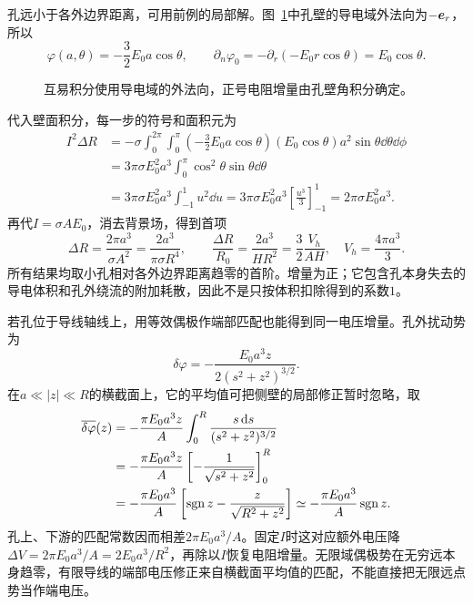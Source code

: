 \begin{solution}
孔远小于各外边界距离，可用前例的局部解。图~\ref{fig:es3-e12-s}中孔壁的导电域外法向为$-\bm{e}_r$，所以
\[\varphi(a,\theta)=-\frac32E_0a\cos\theta,
\qquad\partial_n\varphi_0=-\partial_r(-E_0r\cos\theta)=E_0\cos\theta.
\]
\begin{figure}[H]\centering
{}
\caption{互易积分使用导电域的外法向，正号电阻增量由孔壁角积分确定。}\label{fig:es3-e12-s}
\end{figure}
代入壁面积分，每一步的符号和面积元为
\[\begin{aligned}
I^2\Delta R
&=-\sigma\int_0^{2\pi}\!\int_0^\pi
\left(-\frac32E_0a\cos\theta\right)(E_0\cos\theta)
a^2\sin\theta\dd\theta\dd\phi\\
&=3\pi\sigma E_0^2a^3\int_0^\pi\cos^2\theta\sin\theta\dd\theta\\
&=3\pi\sigma E_0^2a^3\int_{-1}^{1}u^2\dd u
=3\pi\sigma E_0^2a^3\left[\frac{u^3}3\right]_{-1}^1
=2\pi\sigma E_0^2a^3.
\end{aligned}\]
再代$I=\sigma AE_0$，消去背景场，得到首项
\[\boxed{\Delta R=\frac{2\pi a^3}{\sigma A^2}
=\frac{2a^3}{\pi\sigma R^4}},\qquad
\boxed{\frac{\Delta R}{R_0}=\frac{2a^3}{HR^2}=\frac32\frac{V_h}{AH}},
\quad V_h=\frac{4\pi a^3}{3}.
\]
所有结果均取小孔相对各外边界距离趋零的首阶。增量为正；它包含孔本身失去的导电体积和孔外绕流的附加耗散，因此不是只按体积扣除得到的系数$1$。

若孔位于导线轴线上，用等效偶极作端部匹配也能得到同一电压增量。孔外扰动势为
\[\delta\varphi=-\frac{E_0a^3z}{2(s^2+z^2)^{3/2}}.
\]
在$a\ll|z|\ll R$的横截面上，它的平均值可把侧壁的局部修正暂时忽略，取
\[\begin{aligned}
\overline{\delta\varphi}(z)
&=-\frac{\pi E_0a^3z}{A}\int_0^R\frac{s\mathop{}\!\mathrm d s}{(s^2+z^2)^{3/2}}\\
&=-\frac{\pi E_0a^3z}{A}\left[-\frac1{\sqrt{s^2+z^2}}\right]_0^R\\
&=-\frac{\pi E_0a^3}{A}\left[\operatorname{sgn} z-\frac z{\sqrt{R^2+z^2}}\right]
\simeq-\frac{\pi E_0a^3}{A}\operatorname{sgn} z.
\end{aligned}\]
孔上、下游的匹配常数因而相差$2\pi E_0a^3/A$。固定$I$时这对应额外电压降$\Delta V=2\pi E_0a^3/A=2E_0a^3/R^2$，再除以$I$恢复电阻增量。无限域偶极势在无穷远本身趋零，有限导线的端部电压修正来自横截面平均值的匹配，不能直接把无限远点势当作端电压。
\end{solution}


